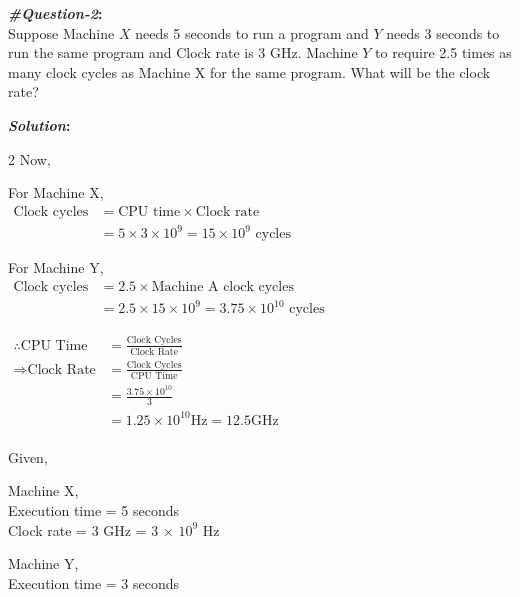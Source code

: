 \textbf{\textit{\#Question-2}:}\\
Suppose Machine $X$ needs 5 seconds to run a program and $Y$ needs 3 seconds to run the same program and Clock rate is 3 GHz. Machine $Y$ to require 2.5 times as many clock cycles as Machine X for the same program. What will be the clock rate?

\textbf{\textit{Solution}:}
\begin{multicols}{2}
   \noindent
   \raggedcolumns
   Now,

   For Machine X,\\[0.5em]
   $\begin{aligned}
      \text{Clock cycles} &= \text{CPU time} \times \text{Clock rate}\\
      &= \text{5} \times \text{3} \times \text{10}^{\text{9}}
      = \text{15} \times \text{10}^{\text{9}} \text{ cycles}
   \end{aligned}$

   For Machine Y,\\[0.5em]
   $\begin{aligned}
      \text{Clock cycles} &= \text{2.5} \times \text{Machine A clock cycles}\\
      &= \text{2.5} \times \text{15} \times \text{10}^{\text{9}}
      = \text{3.75} \times \text{10}^{\text{10}} \text{ cycles}
   \end{aligned}$

   $\begin{aligned}
     \therefore \text{CPU Time} &= \frac{\text{Clock Cycles}}{\text{Clock Rate}} \\[0.5em]
     \Rightarrow \text{Clock Rate} &= \frac{\text{Clock Cycles}}{\text{CPU Time}} \\
       &= \frac{\text{3.75} \times \text{10}^{\text{10}}}{\text{3}} \\
       &= \text{1.25} \times \text{10}^{\text{10}} \text{Hz}
       = \text{12.5} \text{GHz} \\
   \end{aligned}$


   \columnbreak
   Given,

   Machine X,\\
   Execution time = 5 seconds\\
   Clock rate = 3 GHz = 3 $\times$ $\text{10}^{\text{9}}$ Hz

   Machine Y,\\
   Execution time = 3 seconds\\
\end{multicols}


